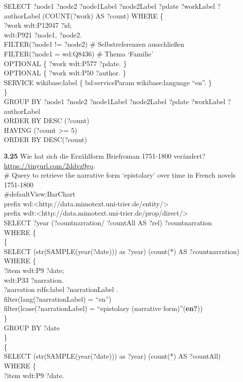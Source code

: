 \documentclass[
  12pt,
  letterpaper,
  DIV=11,
  numbers=noendperiod]{scrreprt}
\begin{document}
SELECT ?node1 ?node2 ?node1Label ?node2Label ?pdate ?workLabel
?authorLabel (COUNT(?work) AS ?count) WHERE \{\\
?work wdt:P12047 ?id;\\
wdt:P921 ?node1, ?node2.\\
FILTER(?node1 != ?node2) \# Selbstreferenzen ausschließen\\
FILTER(?node1 = wd:Q8436) \# Thema `Familie'\\
OPTIONAL \{ ?work wdt:P577 ?pdate. \}\\
OPTIONAL \{ ?work wdt:P50 ?author. \}\\
SERVICE wikibase:label \{ bd:serviceParam wikibase:language ``en''. \}\\
\}\\
GROUP BY ?node1 ?node2 ?node1Label ?node2Label ?pdate ?workLabel
?authorLabel\\
ORDER BY DESC (?count)\\
HAVING (?count \textgreater= 5)\\
ORDER BY DESC(?count)

\textbf{3.25} Wie hat sich die Erzählform Briefroman 1751-1800
verändert?
\href{https://tinyurl.com/25a25soc}{https://tinyurl.com/2ddvz9go}.\\
\# Query to retrieve the narrative form `epistolary' over time in French
novels 1751-1800\\
\#defaultView:BarChart\\
prefix
wd:\textless http://data.mimotext.uni-trier.de/entity/\textgreater{}\\
prefix
wdt:\textless http://data.mimotext.uni-trier.de/prop/direct/\textgreater{}\\
SELECT ?year (?countnarration/ ?countAll AS ?rel) ?countnarration\\
WHERE \{\\
\{\\
SELECT (str(SAMPLE(year(?date))) as ?year) (count(*) AS
?countnarration)\\
WHERE \{\\
?item wdt:P9 ?date;\\
wdt:P33 ?narration.\\
?narration rdfs:label ?narrationLabel .\\
filter(lang(?narrationLabel) = ``en'')\\
filter(lcase(?narrationLabel) = ``epistolary (narrative
form)''(\textbf{en?}))\\
\}\\
GROUP BY ?date\\
\}\\
\{\\
SELECT (str(SAMPLE(year(?date))) as ?year) (count(*) AS ?countAll)\\
WHERE \{\\
?item wdt:P9 ?date.
\end{document}
